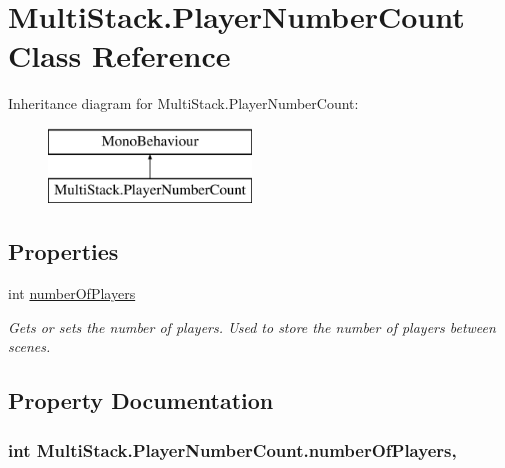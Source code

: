 \hypertarget{class_multi_stack_1_1_player_number_count}{}\section{Multi\+Stack.\+Player\+Number\+Count Class Reference}
\label{class_multi_stack_1_1_player_number_count}
Inheritance diagram for Multi\+Stack.\+Player\+Number\+Count\+:\begin{figure}[H]
\begin{center}
\leavevmode
\includegraphics[height=2.000000cm]{class_multi_stack_1_1_player_number_count}
\end{center}
\end{figure}
\subsection*{Properties}
\begin{DoxyCompactItemize}
\item 
int \hyperlink{class_multi_stack_1_1_player_number_count_a39097aa99803f5dfc0e1c19283785d88}{number\+Of\+Players}
\begin{DoxyCompactList}\small\item\em Gets or sets the number of players. Used to store the number of players between scenes. \end{DoxyCompactList}\end{DoxyCompactItemize}


\subsection{Property Documentation}
\hypertarget{class_multi_stack_1_1_player_number_count_a39097aa99803f5dfc0e1c19283785d88}{}
\subsubsection[{number\+Of\+Players}]{\setlength{\rightskip}{0pt plus 5cm}int Multi\+Stack.\+Player\+Number\+Count.\+number\+Of\+Players\hspace{0.3cm}{\ttfamily [get]}, {\ttfamily [set]}}\label{class_multi_stack_1_1_player_number_count_a39097aa99803f5dfc0e1c19283785d88}


